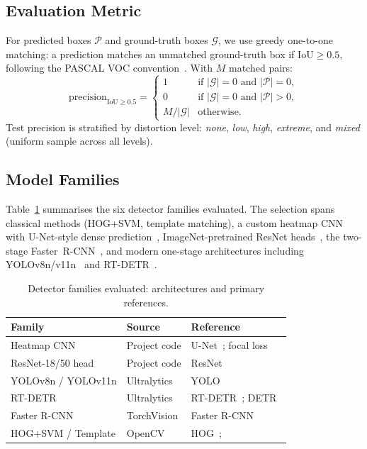 \documentclass[11pt,a4paper]{article}
\begin{document}
\subsection{Evaluation Metric}
\label{sec:metric}

For predicted boxes $\mathcal{P}$ and ground-truth boxes $\mathcal{G}$, we use greedy one-to-one matching: a prediction matches an unmatched ground-truth box if $\mathrm{IoU} \geq 0.5$, following the PASCAL VOC convention~\citep{everingham2010pascal}. With $M$ matched pairs:
\begin{equation}
  \text{precision}_{\mathrm{IoU \geq 0.5}} =
  \begin{cases}
    1 & \text{if }|\mathcal{G}|=0\text{ and }|\mathcal{P}|=0,\\
    0 & \text{if }|\mathcal{G}|=0\text{ and }|\mathcal{P}|>0,\\
    M/|\mathcal{G}| & \text{otherwise.}
  \end{cases}
\end{equation}
Test precision is stratified by distortion level: \emph{none}, \emph{low}, \emph{high}, \emph{extreme}, and \emph{mixed} (uniform sample across all levels).

\subsection{Model Families}
\label{sec:models}

Table~\ref{tab:refs} summarises the six detector families evaluated. The selection spans classical methods (HOG+SVM, template matching), a custom heatmap CNN with U-Net-style dense prediction~\citep{ronneberger2015unet}, ImageNet-pretrained ResNet heads~\citep{he2016resnet}, the two-stage Faster~R-CNN~\citep{ren2015fasterrcnn}, and modern one-stage architectures including YOLOv8n/v11n~\citep{redmon2018yolov3,ultralytics_yolo_docs,khanam2024yolo11} and RT-DETR~\citep{zhao2024rtdetr,carion2020detr}.

\begin{table}[H]
  \centering
  \caption{Detector families evaluated: architectures and primary references.}
  \label{tab:refs}
  \small
  \begin{tabular}{@{}p{3.1cm}p{4.2cm}p{6.4cm}@{}}
    \toprule
    \textbf{Family} & \textbf{Source} & \textbf{Reference} \\
    \midrule
    Heatmap CNN & Project code & U-Net~\citep{ronneberger2015unet}; focal loss~\citep{lin2017focal} \\
    ResNet-18/50 head & Project code & ResNet~\citep{he2016resnet} \\
    YOLOv8n / YOLOv11n & Ultralytics & YOLO~\citep{redmon2017yolo9000,redmon2018yolov3,khanam2024yolo11} \\
    RT-DETR & Ultralytics & RT-DETR~\citep{zhao2024rtdetr}; DETR~\citep{carion2020detr} \\
    Faster R-CNN & TorchVision & Faster R-CNN~\citep{ren2015fasterrcnn} \\
    HOG+SVM / Template & OpenCV & HOG~\citep{dalal2005hog}; \citealp{szeliski2010cv} \\
    \bottomrule
  \end{tabular}
\end{table}
\end{document}
